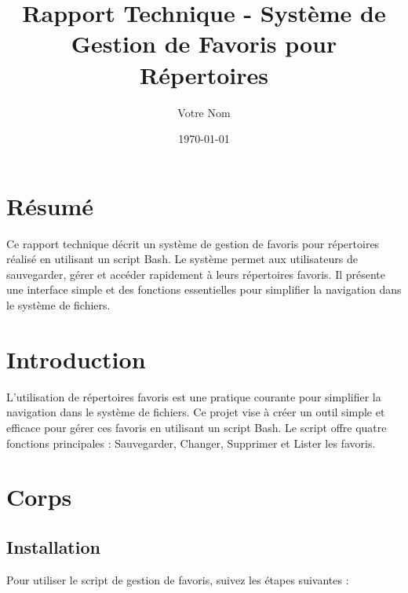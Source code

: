 \documentclass[a4paper, 12pt]{article}
\title{Rapport Technique - Système de Gestion de Favoris pour Répertoires}
\author{Votre Nom}
\date{\today}
\begin{document}
\maketitle

\section{Résumé}
Ce rapport technique décrit un système de gestion de favoris pour répertoires réalisé en utilisant un script Bash. Le système permet aux utilisateurs de sauvegarder, gérer et accéder rapidement à leurs répertoires favoris. Il présente une interface simple et des fonctions essentielles pour simplifier la navigation dans le système de fichiers.

\section{Introduction}
L'utilisation de répertoires favoris est une pratique courante pour simplifier la navigation dans le système de fichiers. Ce projet vise à créer un outil simple et efficace pour gérer ces favoris en utilisant un script Bash. Le script offre quatre fonctions principales : Sauvegarder, Changer, Supprimer et Lister les favoris.

\section{Corps}
\subsection{Installation}

Pour utiliser le script de gestion de favoris, suivez les étapes suivantes :
\end{document}
